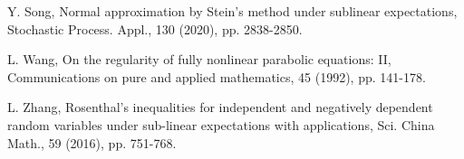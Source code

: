 \documentclass[a4paper,oneside,10pt]{article}%
\numberwithin{equation}{section}
\begin{document}
\begin{thebibliography}{99}
Y. Song, Normal approximation by Stein's method under
sublinear expectations, Stochastic Process. Appl., 130 (2020), pp. 2838-2850.



L. Wang, On the regularity of fully nonlinear parabolic
equations: II, Communications on pure and applied mathematics, 45 (1992), pp. 141-178.

L. Zhang, Rosenthal's inequalities for independent and
negatively dependent random variables under sub-linear expectations with
applications, Sci. China Math., 59 (2016), pp. 751-768.
\end{thebibliography}
\end{document}
